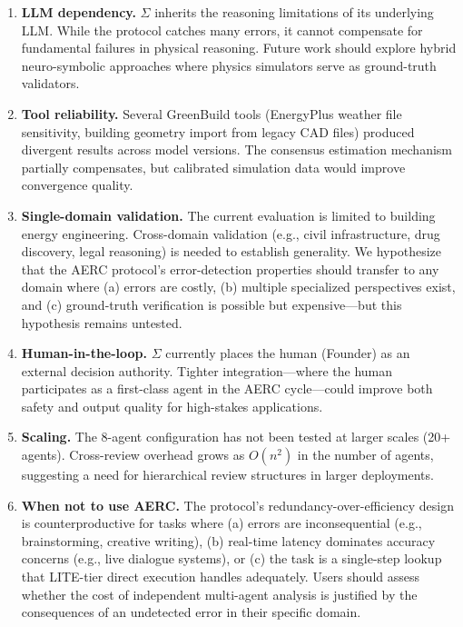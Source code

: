 \documentclass[11pt,a4paper]{article}
\begin{document}
\begin{enumerate}
    \item \textbf{LLM dependency.} $\Sigma$ inherits the reasoning limitations of its underlying LLM. While the protocol catches many errors, it cannot compensate for fundamental failures in physical reasoning. Future work should explore hybrid neuro-symbolic approaches where physics simulators serve as ground-truth validators.

    \item \textbf{Tool reliability.} Several GreenBuild tools (EnergyPlus weather file sensitivity, building geometry import from legacy CAD files) produced divergent results across model versions. The consensus estimation mechanism partially compensates, but calibrated simulation data would improve convergence quality.

    \item \textbf{Single-domain validation.} The current evaluation is limited to building energy engineering. Cross-domain validation (e.g., civil infrastructure, drug discovery, legal reasoning) is needed to establish generality. We hypothesize that the AERC protocol's error-detection properties should transfer to any domain where (a) errors are costly, (b) multiple specialized perspectives exist, and (c) ground-truth verification is possible but expensive---but this hypothesis remains untested.

    \item \textbf{Human-in-the-loop.} $\Sigma$ currently places the human (Founder) as an external decision authority. Tighter integration---where the human participates as a first-class agent in the AERC cycle---could improve both safety and output quality for high-stakes applications.

    \item \textbf{Scaling.} The 8-agent configuration has not been tested at larger scales (20+ agents). Cross-review overhead grows as $O(n^2)$ in the number of agents, suggesting a need for hierarchical review structures in larger deployments.

    \item \textbf{When not to use AERC.} The protocol's redundancy-over-efficiency design is counterproductive for tasks where (a) errors are inconsequential (e.g., brainstorming, creative writing), (b) real-time latency dominates accuracy concerns (e.g., live dialogue systems), or (c) the task is a single-step lookup that LITE-tier direct execution handles adequately. Users should assess whether the cost of independent multi-agent analysis is justified by the consequences of an undetected error in their specific domain.
\end{enumerate}
\end{document}

